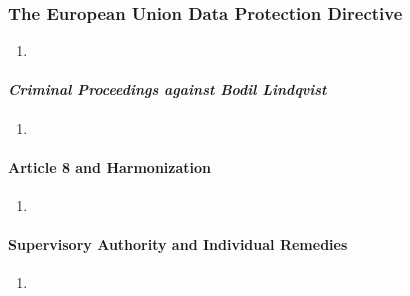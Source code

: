 \subsubsection{The European Union Data Protection Directive}

\begin{enumerate}
    \item %
\end{enumerate}

\paragraph{\emph{Criminal Proceedings against Bodil Lindqvist}}

\begin{enumerate}
    \item %
\end{enumerate}

\paragraph{Article 8 and Harmonization}

\begin{enumerate}
    \item %
\end{enumerate}

\paragraph{Supervisory Authority and Individual Remedies}

\begin{enumerate}
    \item %
\end{enumerate}

